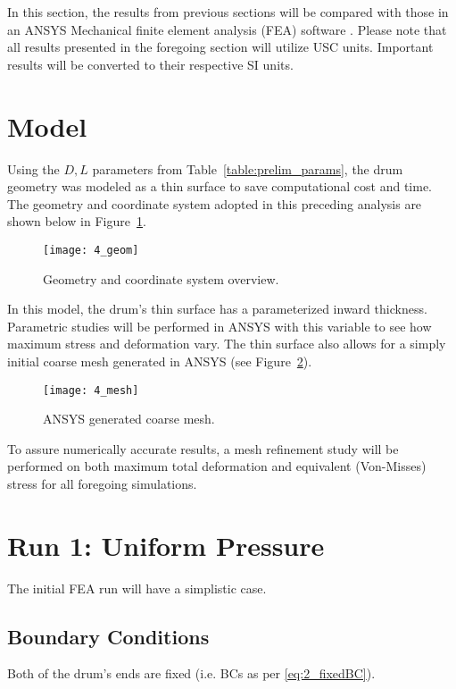 In this section, the results from previous sections will be compared with those in an ANSYS Mechanical finite element analysis (FEA) software \cite{ANSYS}. Please note that all results presented in the foregoing section will utilize USC units. Important results will be converted to their respective SI units.

\section{Model}

Using the $D, L$ parameters from Table~\ref{table:prelim_params}, the drum geometry was modeled as a thin surface to save computational cost and time. The geometry and coordinate system adopted in this preceding analysis are shown below in Figure~\ref{fig:4_geom}.

\begin{figure}[H]
	\centering
	\texttt{[image: 4\_geom]}
	\caption{Geometry and coordinate system overview.}
	\label{fig:4_geom}
\end{figure}

In this model, the drum's thin surface has a parameterized inward thickness. Parametric studies will be performed in ANSYS with this variable to see how maximum stress and deformation vary. The thin surface also allows for a simply initial coarse mesh generated in ANSYS (see Figure~\ref{fig:4_mesh}).

\begin{figure}[H]
	\centering
	\texttt{[image: 4\_mesh]}
	\caption{ANSYS generated coarse mesh.}
	\label{fig:4_mesh}
\end{figure}

To assure numerically accurate results, a mesh refinement study will be performed on both maximum total deformation and equivalent (Von-Misses) stress for all foregoing simulations.



\section{Run 1: Uniform Pressure}
\label{section:4_R1}
The initial FEA run will have a simplistic case. 

\subsection{Boundary Conditions}
\label{subsection:R1BC}
Both of the drum's ends are fixed (i.e. BCs as per \ref{eq:2_fixedBC}).\\

